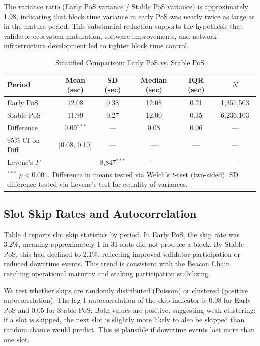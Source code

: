 \documentclass[12pt]{article}
\begin{document}
The variance ratio (Early PoS variance / Stable PoS variance) is approximately 1.98, indicating that block time variance in early PoS was nearly twice as large as in the mature period. This substantial reduction supports the hypothesis that validator ecosystem maturation, software improvements, and network infrastructure development led to tighter block time control.

\begin{table}[h]
\centering
\caption{Stratified Comparison: Early PoS vs. Stable PoS}
\label{tab:stratified}
\begin{tabular}{lccccc}
\toprule
Period & Mean (sec) & SD (sec) & Median (sec) & IQR (sec) & $N$ \\
\midrule
Early PoS & 12.08 & 0.38 & 12.08 & 0.21 & 1,351,503 \\
Stable PoS & 11.99 & 0.27 & 12.00 & 0.15 & 6,236,103 \\
Difference & 0.09$^{\ast\ast\ast}$ & — & 0.08 & 0.06 & — \\
95\% CI on Diff & [0.08, 0.10] & — & — & — & — \\
Levene's $F$ & — & 8,847$^{\ast\ast\ast}$ & — & — & — \\
\bottomrule
\multicolumn{6}{p{14cm}}{\footnotesize $^{\ast\ast\ast}$ $p < 0.001$. Difference in means tested via Welch's $t$-test (two-sided). SD difference tested via Levene's test for equality of variances.}
\end{tabular}
\end{table}

\subsection{Slot Skip Rates and Autocorrelation}

Table 4 reports slot skip statistics by period. In Early PoS, the skip rate was 3.2\%, meaning approximately 1 in 31 slots did not produce a block. By Stable PoS, this had declined to 2.1\%, reflecting improved validator participation or reduced downtime events. This trend is consistent with the Beacon Chain reaching operational maturity and staking participation stabilizing.

We test whether skips are randomly distributed (Poisson) or clustered (positive autocorrelation). The lag-1 autocorrelation of the skip indicator is 0.08 for Early PoS and 0.05 for Stable PoS. Both values are positive, suggesting weak clustering: if a slot is skipped, the next slot is slightly more likely to also be skipped than random chance would predict. This is plausible if downtime events last more than one slot.
\end{document}
